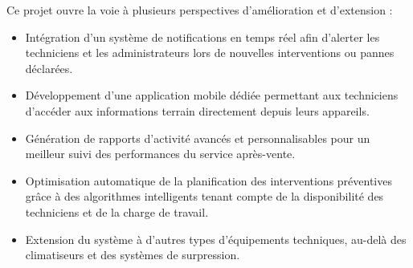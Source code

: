 Ce projet ouvre la voie à plusieurs perspectives d'amélioration et d'extension :

\begin{itemize}
    \item Intégration d'un système de notifications en temps réel afin d'alerter les techniciens et les administrateurs lors de nouvelles interventions ou pannes déclarées.
    \item Développement d'une application mobile dédiée permettant aux techniciens d'accéder aux informations terrain directement depuis leurs appareils.
    \item Génération de rapports d'activité avancés et personnalisables pour un meilleur suivi des performances du service après-vente.
    \item Optimisation automatique de la planification des interventions préventives grâce à des algorithmes intelligents tenant compte de la disponibilité des techniciens et de la charge de travail.
    \item Extension du système à d'autres types d'équipements techniques, au-delà des climatiseurs et des systèmes de surpression.
\end{itemize}

